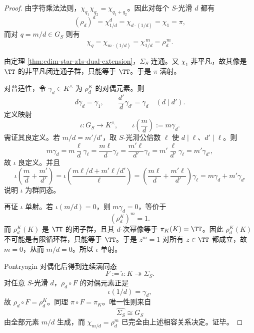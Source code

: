 \begin{proof}
由字符乘法法则，\(\chi_{q_1}\chi_{q_2}=\chi_{q_1+q_2}\)。因此对每个 \(S\)-光滑 \(d\) 都有
\[
(\rho_d)^d
=
\chi_{1/d}^d
=
\chi_{d\cdot (1/d)}
=
\chi_1
=
\pi,
\]
而对 \(q=m/d\in G_S\) 则有
\[
\chi_q
=
\chi_{m\cdot(1/d)}
=
\chi_{1/d}^{\,m}
=
\rho_d^{\,m}.
\]

由定理 \ref{thm:cdim-star-z1s-dual-extension}，\(\Sigma_S\) 连通。又 \(\chi_1\) 非平凡，故其像是 \(\TT\) 的非平凡闭连通子群，只能等于 \(\TT\)。于是 \(\pi\) 满射。

对普适性，令 \(\gamma_d\in K^\wedge\) 为 \(\rho_d^K\) 的对偶元素。则
\[
d\gamma_d=\gamma_1,
\qquad
\frac{d'}{d}\gamma_{d'}=\gamma_d
\quad (d\mid d').
\]
定义映射
\[
\iota:G_S\longrightarrow K^\wedge,
\qquad
\iota\!\left(\frac{m}{d}\right):=m\gamma_d.
\]
需证其良定义。若 \(m/d=m'/d'\)，取 \(S\)-光滑公倍数 \(\ell\) 使 \(d\mid \ell\)、\(d'\mid \ell\)。则
\[
m\gamma_d
=
m\frac{\ell}{d}\gamma_\ell
=
\frac{m\ell}{d}\gamma_\ell
=
\frac{m'\ell}{d'}\gamma_\ell
=
m'\frac{\ell}{d'}\gamma_\ell
=
m'\gamma_{d'},
\]
故 \(\iota\) 良定义。并且
\[
\iota\!\left(\frac{m}{d}+\frac{m'}{d'}\right)
=
\iota\!\left(\frac{m\ell/d+m'\ell/d'}{\ell}\right)
=
\left(\frac{m\ell}{d}+\frac{m'\ell}{d'}\right)\gamma_\ell
=
m\gamma_d+m'\gamma_{d'}
\]
说明 \(\iota\) 为群同态。

再证 \(\iota\) 单射。若 \(\iota(m/d)=0\)，则 \(m\gamma_d=0\)，等价于
\[
(\rho_d^K)^m=1.
\]
而 \(\rho_d^K(K)\) 是 \(\TT\) 的闭子群，且其 \(d\)-次幂像等于 \(\pi_K(K)=\TT\)。因此 \(\rho_d^K(K)\) 不可能是有限循环群，只能等于 \(\TT\)。于是 \(z^m=1\) 对所有 \(z\in\TT\) 都成立，故 \(m=0\)，从而 \(m/d=0\)。所以 \(\iota\) 单射。

Pontryagin 对偶化后得到连续满同态
\[
F:=\widehat{\iota}:K\twoheadrightarrow \Sigma_S.
\]
对任意 \(S\)-光滑 \(d\)，\(\rho_d\circ F\) 的对偶元素正是
\[
\iota(1/d)=\gamma_d,
\]
故 \(\rho_d\circ F=\rho_d^K\)。同理 \(\pi\circ F=\pi_K\)。唯一性则来自
\[
\widehat{\Sigma_S}\cong G_S
\]
由全部元素 \(m/d\) 生成，而 \(\chi_{m/d}=\rho_d^m\) 已完全由上述相容关系决定。证毕。
\end{proof}


